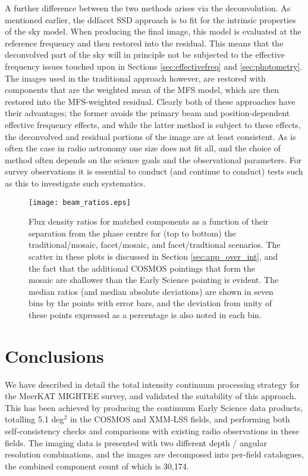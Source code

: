 \documentclass[usenatbib,usedcolumn]{mnras}
\begin{document}
A further difference between the two methods arises via the deconvolution. As mentioned earlier, the {\sc ddfacet} SSD approach is to fit for the intrinsic properties of the sky model. When producing the final image, this model is evaluated at the reference frequency and then restored into the residual. This means that the deconvolved part of the sky will in principle not be subjected to the effective frequency issues touched upon in Sections \ref{sec:effectivefreq} and \ref{sec:photometry}. The images used in the traditional approach however, are restored with components that are the weighted mean of the MFS model, which are then restored into the MFS-weighted residual. Clearly both of these approaches have their advantages; the former avoids the primary beam and position-dependent effective frequency effects, and while the latter method is subject to these effects, the deconvolved and residual portions of the image are at least consistent. As is often the case in radio astronomy one size does not fit all, and the choice of method often depends on the science goals and the observational parameters. For survey observations it is essential to conduct (and continue to conduct) tests such as this to investigate such systematics.

\begin{figure}
 \texttt{[image: beam\_ratios.eps]}
 \caption{Flux density ratios for matched components as a function of their separation from the phase centre for (top to bottom) the traditional/mosaic, facet/mosaic, and facet/tradtional scenarios. The scatter in these plots is discussed in Section \ref{sec:app_over_int}, and the fact that the additional COSMOS pointings that form the mosaic are shallower than the Early Science pointing is evident. The median ratios (and median absolute deviations) are shown in seven bins by the points with error bars, and the deviation from unity of these points expressed as a percentage is also noted in each bin.}
 \label{fig:beam_ratios}
\end{figure}

\section{Conclusions}

We have described in detail the total intensity continuum processing strategy for the MeerKAT MIGHTEE survey, and validated the suitability of this approach. This has been achieved by producing the continuum Early Science data products, totalling 5.1 deg$^{2}$ in the COSMOS and XMM-LSS fields, and performing both self-consistency checks and comparisons with existing radio observations in these fields. The imaging data is presented with two different depth / angular resolution combinations, and the images are decomposed into per-field catalogues, the combined component count of which is 30,174.
\end{document}

